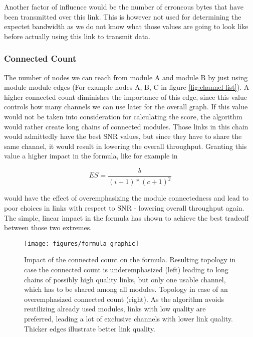 	Another factor of influence would be the number of erroneous bytes that have been transmitted over this link. 
	This is however not used for determining the expectet bandwidth as we do not know what those values are going to 
	look like before actually using this link to transmit data.

      \subsubsection{Connected Count}
	The number of nodes we can reach from module A and module B by just using module-module edges (For example nodes A, B, C in figure \ref{fig:channel-list}). 
	A higher connected count diminishes the importance of this edge, since this value controls how many channels we can use later for the overall graph.
	If this value would not be taken into consideration for calculating the score, the algorithm would rather create long chains of connected modules. 
	Those links in this chain would admittedly have the best \ac{SNR} values, but since they have to share the same channel, 
	it would result in lowering the overall throughput. Granting this value a higher impact in the formula, like for example in 
	
	\begin{equation}
	  ES=\frac{b}{(i + 1)* (c + 1)^2}
	\end{equation}
	
	would have the effect of overemphasizing the module connectedness and lead to poor choices in links with respect to \ac{SNR} - 
	lowering overall throughput again. The simple, linear impact in the formula has shown to achieve the best tradeoff between those two extremes.
	
	\begin{figure}[h!]
	  \centering
	  \texttt{[image: figures/formula\_graphic]}
	  \caption{Impact of the connected count on the formula. Resulting topology in case the connected count is underemphasized (left) leading
	    to long chains of possibly high quality links, but only one usable channel, which has to be shared among all modules.
	    Topology in case of an overemphasized connected count (right). As the algorithm avoids reutilizing already used modules,
	    links with low quality are preferred, leading a lot of exclusive channels with lower link quality. Thicker edges illustrate better link quality.}
	  \label{fig:formula_graphic}
	\end{figure}

\newpage
	
